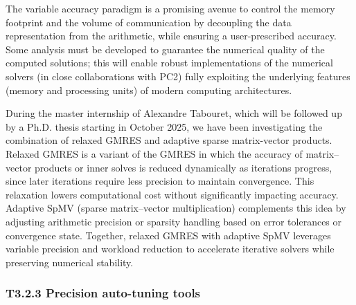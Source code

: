 The variable accuracy paradigm is a promising avenue to control the memory footprint and the
volume of communication by decoupling the data representation from the arithmetic, while ensuring a
user-prescribed accuracy. Some analysis must be developed to guarantee the numerical quality of the
computed solutions; this will enable robust implementations of the numerical solvers (in close
collaborations with PC2) fully exploiting the underlying features (memory and processing units) of
modern computing architectures. 


During the master internship of Alexandre Tabouret, which will be followed up by a Ph.D. thesis starting in October 2025, we have been investigating the combination of relaxed GMRES and adaptive sparse matrix-vector products. Relaxed GMRES is a variant of the GMRES in which the accuracy of matrix–vector products or inner solves is reduced dynamically as iterations progress, since later iterations require less precision to maintain convergence. This relaxation lowers computational cost without significantly impacting accuracy. Adaptive SpMV (sparse matrix–vector multiplication) complements this idea by adjusting arithmetic precision or sparsity handling based on error tolerances or convergence state. Together, relaxed GMRES with adaptive SpMV leverages variable precision and workload reduction to accelerate iterative solvers while preserving numerical stability.

\subsubsection{ 
T3.2.3 Precision auto-tuning tools
} 

